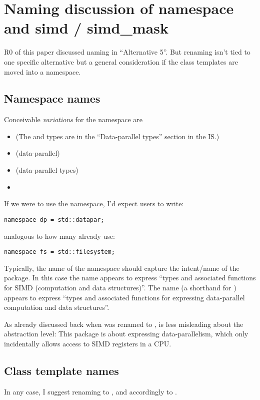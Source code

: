 \section{Naming discussion of namespace and simd / simd_mask}\label{sec:naming}
R0 of this paper discussed naming in “Alternative 5”.
But renaming isn't tied to one specific alternative but a general consideration
if the class templates are moved into a namespace.

\subsection{Namespace names}
Conceivable \emph{variations} for the \std{} namespace are
\begin{itemize}
  \item \std{} (The \simd and \mask types are in the “Data-parallel types” section in the IS.)
  \item \std{} (data-parallel)
  \item \std{} (data-parallel types)
  \item \std{}
\end{itemize}

If we were to use the  namespace, I'd expect users to write:\smallskip
\begin{lstlisting}
namespace dp = std::datapar;
\end{lstlisting}
analogous to how many already use:\smallskip
\begin{lstlisting}
namespace fs = std::filesystem;
\end{lstlisting}

Typically, the name of the namespace should capture the intent/name of the
package.
In this case the name  appears to express “types and associated
functions for SIMD (computation and data structures)”.
The name  (a shorthand for ) appears
to express “types and associated functions for expressing data-parallel
computation and data structures”.

As already discussed back when \stdx{} was renamed to
\stdx{},  is less misleading about the
abstraction level:
This package is about expressing data-parallelism, which only incidentally
allows access to SIMD registers in a CPU.


\subsection{Class template names}
In any case, I suggest renaming \mask to , and accordingly
 to .


